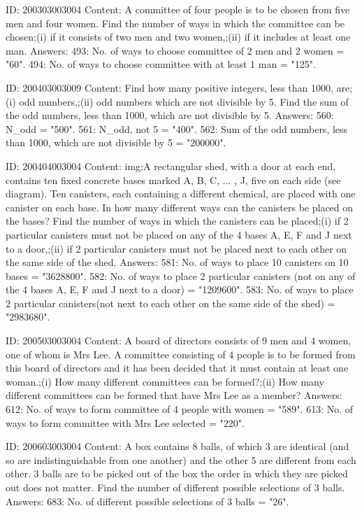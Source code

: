 \documentclass{article}
\begin{document}
ID: 200303003004
Content:
A committee of four people is to be chosen from five men and four women. Find the number of ways in which the committee can be chosen;(i) if it consists of two men and two women,;(ii) if it includes at least one man. Answers:
493: No. of ways to choose committee of 2 men and 2 women = "60".
494: No. of ways to choose committee with at least 1 man = "125".

ID: 200403003009
Content:
Find how many positive integers, less than 1000, are;(i) odd numbers,;(ii) odd numbers which are not divisible by 5. Find the sum of the odd numbers, less than 1000, which are not divisible by 5.  Answers:
560: N_{odd} = "500".
561: N_{odd}, not 5 = "400".
562: Sum of the odd numbers, less than 1000, which are not divisible by 5 = "200000".

ID: 200404003004
Content:
img;A rectangular shed, with a door at each end, contains ten fixed concrete bases marked A, B, C, ... , J, five on each side (see diagram). Ten canisters, each containing a different chemical, are placed with one canister on   each base. In how many different ways can the canisters be placed on the bases? Find the number of ways in which the canisters can be placed;(i) if 2 particular canisters must not be placed on any of the 4 bases A, E, F and J next to a door,;(ii) if 2 particular canisters must not be placed next to each other on the same side of the shed. Answers:
581: No. of ways to place 10 canisters on 10 bases = "3628800".
582: No. of ways to place 2 particular canisters (not on any of the 4 bases A, E, F and J next to a door) = "1209600".
583: No. of ways to place 2 particular canisters(not next to each other on the same side of the shed) = "2983680".

ID: 200503003004
Content:
A board of directors consists of 9 men and 4 women, one of whom is Mrs Lee. A committee consisting of 4 people is to be formed from this board of directors and it has been decided that it must contain at least one woman.;(i) How many different committees can be formed?;(ii) How many different committees can be formed that have Mrs Lee as a member? Answers:
612: No. of ways to form committee of 4 people with  women = "589".
613: No. of ways to form committee with Mrs Lee selected = "220".

ID: 200603003004
Content:
A box contains 8 balls, of which 3 are identical (and so are indistinguishable from one another) and the other 5 are different from each other. 3 balls are to be picked out of the box  the order in which they are picked out does not matter. Find the number of different possible selections of 3 balls. Answers:
683: No. of different possible selections of 3 balls = "26".
\end{document}
